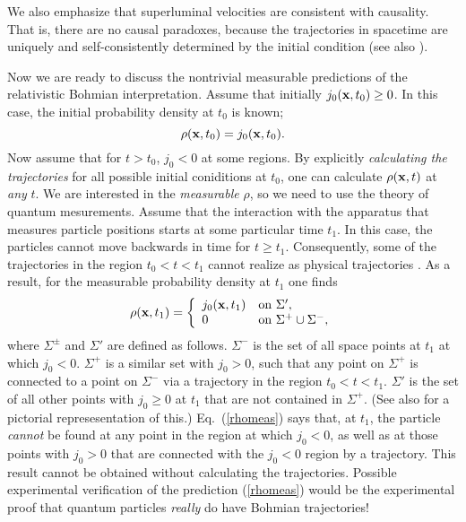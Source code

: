 \documentclass[10pt,twoside]{aipproc} %
\begin{document}
We also emphasize that
superluminal velocities are consistent with causality.
That is, there are no causal paradoxes, because
the trajectories in spacetime are uniquely and self-consistently 
determined by the initial condition (see also \cite{nikolcaus}). 

Now we are ready to discuss the nontrivial measurable predictions of 
the relativistic Bohmian interpretation. 
Assume that initially
$j_0({\bf x},t_0)\geq 0$. In this case,
the initial probability density at $t_0$ is known;
\begin{equation}
\rho({\bf x},t_0)=j_0({\bf x},t_0) .
\end{equation}
Now assume that for $t>t_0$, $j_0<0$ at some regions. 
By explicitly {\em calculating the trajectories} for all possible 
initial coniditions at $t_0$, one can calculate 
$\rho({\bf x},t)$ at {\em any} $t$.  
We are interested in the {\em measurable} $\rho$, so we need to use 
the theory of quantum mesurements. 
Assume that the interaction with the apparatus that 
measures particle positions 
starts at some particular time $t_1$. 
In this case, the particles cannot move backwards in time 
for $t\geq t_1$. Consequently, some of the trajectories 
in the region $t_0<t<t_1$ cannot realize as physical trajectories
\cite{nikolfpl3}. As a result, for the measurable probability 
density at $t_1$ one finds \cite{nikolfpl3} 
\begin{equation}\label{rhomeas}
\rho({\bf x},t_1)=\left\{  
\begin{array}{ll}
j_0({\bf x},t_1) & \mbox{on $\Sigma'$}, \\
0 & \mbox{on $\Sigma^+\cup\Sigma^-$},
\end{array}   
\right.
\end{equation}
where $\Sigma^{\pm}$ and $\Sigma'$ are defined as follows.
$\Sigma^-$ is the set of all space points at $t_1$ at which 
$j_0<0$. $\Sigma^+$ is a similar set with $j_0>0$, such that
any point on $\Sigma^+$ is connected to a point on $\Sigma^-$   
via a trajectory in the region $t_0<t<t_1$. $\Sigma'$ is the 
set of all other points with $j_0\geq 0$ at $t_1$ that are 
not contained in $\Sigma^+$. (See also \cite{nikolfpl3} for a 
pictorial represesentation of this.) 
Eq.~(\ref{rhomeas}) says that,
at $t_1$, the particle {\em cannot} be found at 
any point in the region at which $j_0<0$, as well as at 
those points with $j_0>0$ that are connected 
with the $j_0<0$ region by a trajectory. 
This result cannot be obtained without 
calculating the trajectories. 
Possible experimental verification of the prediction (\ref{rhomeas})
would be 
the experimental proof that quantum particles {\em really} do have 
Bohmian trajectories!
\end{document}
